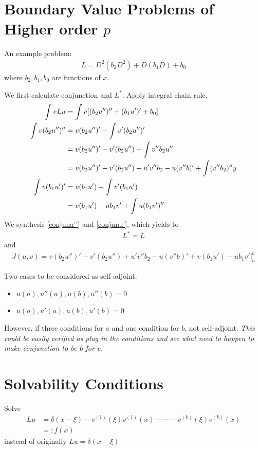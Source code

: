 \documentclass{article}
\numberwithin{equation}{section}
\newcommand{\<}{\langle}
\begin{document}
\section{Boundary Value Problems of Higher order $p$}
\begin{tcolorbox}[colback=blue!10!white]
An example problem:
\begin{align}
	L = D^2(b_2 D^2)+ D(b_1 D)+b_0
\end{align}
where $b_2,b_1,b_0$ are functions of $x$.
\end{tcolorbox}
We first calculate conjunction and $L^*$. Apply integral chain rule,
\begin{align}
	\int v L u &= \int v[(b_2 u'')''+(b_1 u')'+ b_0]\notag\\
	\int v(b_2u'')'' &= v(b_2 u'')'-\int v'(b_2u'')'\notag \\
	&=v(b_2 u'')'-v'(b_2u'') +\int v''b_2u'' \notag\\
	&= v(b_2 u'')'-v'(b_2u'')+u'v''b_2-u(v''b)' +\int(v''b_2)''y \label{conjunu''} \\
	\int v(b_1 u')' &= v(b_1u')-\int v'(b_1u')\notag \\
	&=v(b_1u')-ub_1v'+ \int u(b_1v')'' \label{conjunu'}
\end{align}
We synthesis \eqref{conjunu''} and \eqref{conjunu'}, which yields to 
\begin{align}
	L^* = L
\end{align}
and 
\begin{align}
	J(u,v) = v(b_2 u'')'-v'(b_2u'')+u'v''b_2-u(v''b)'+v(b_1u')-ub_1v'|_a^b
\end{align}
\begin{tcolorbox}[colback=red!5!white, boxrule = 0.1pt]
Two cases to be considered as self adjoint.
\begin{itemize}
	\item $u(a),u''(a),u(b),u''(b)=0$ 
	\item $u(a),u'(a),u(b),u'(b)=0$
\end{itemize}
However, if three conditions for $a$ and one condition for $b$, not self-adjoint. \textit{This could be easily verified as plug in the conditions and see what need to happen to make conjunction to be 0 for $v$.}
\end{tcolorbox}
\section{Solvability Conditions}
Solve \begin{align} L u &=\delta(x-\xi)-v^{(1)}(\xi) v^{(1)}(x)-\cdots-v^{(k)}(\xi) v^{(k)}(x) \\ &=: f(x) \end{align}
instead of originally $L u  = \delta(x- \xi)$
\end{document}
